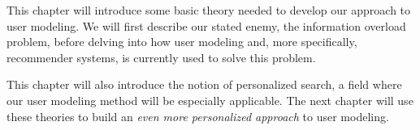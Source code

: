 \label{chap:theory}

This chapter will introduce some basic theory needed to develop our approach to user modeling.
We will first describe our stated enemy, the information overload problem, before delving into
how user modeling and, more specifically, recommender systems, is currently used to solve this problem.

This chapter will also introduce the notion of personalized search, a field where
our user modeling method will be especially applicable.
The next chapter will use these theories to build an \emph{even more personalized approach} to user modeling.


